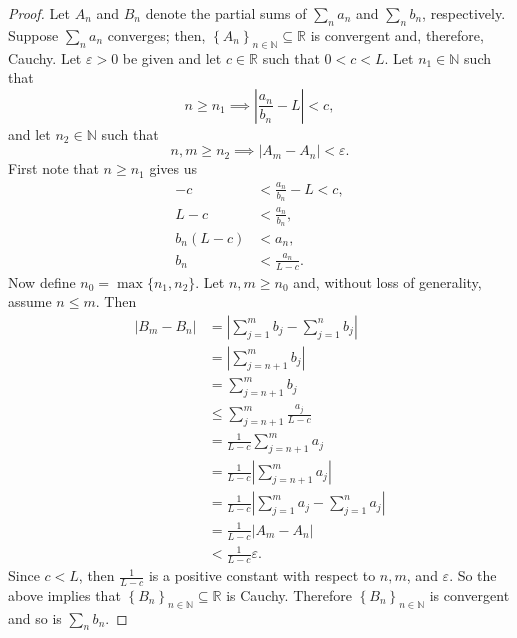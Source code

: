\documentclass[12pt]{article}
\let\eps\varepsilon %
\newcommand{\N}{\mathbb{N}} %
\newcommand{\R}{\mathbb{R}} %
\newcommand{\<}{\left\langle} %
\renewcommand{\>}{\right\rangle} %
\newcommand{\seq}[2][n]{\left\{#2\right\}_{#1\in\N}} %
\begin{document}
\begin{proof}
    Let $A_n$ and $B_n$ denote the partial sums of $\sum_n a_n$ and $\sum_n b_n$, respectively. Suppose $\sum_n a_n$ converges; then, $\seq{A_n}\subseteq\R$ is convergent and, therefore, Cauchy. Let $\eps>0$ be given and let $c\in\R$ such that $0<c<L$. Let $n_1\in\N$ such that
    \[n\geq n_1 \implies \left|\frac{a_n}{b_n} - L\right| < c,\]
    and let $n_2\in\N$ such that
    \[n,m\geq n_2 \implies |A_m - A_n| < \eps.\]
    First note that $n\geq n_1$ gives us
    \begin{align*}
        -c &< \frac{a_n}{b_n} - L < c, \\[1em]
        L - c &< \frac{a_n}{b_n}, \\[1em]
        b_n(L-c) &< a_n, \\[1em]
        b_n &< \frac{a_n}{L-c}.
    \end{align*}
    Now define $n_0=\max\{n_1,n_2\}$. Let $n,m\geq n_0$ and, without loss of generality, assume $n\leq m$. Then
    \allowdisplaybreaks
    \begin{align*}
        |B_m - B_n|
            &= \left|\sum_{j=1}^m b_j - \sum_{j=1}^n b_j\right| \\
            &= \left|\sum_{j=n+1}^m b_j\right| \\
            &= \sum_{j=n+1}^m b_j \\
            &\leq \sum_{j=n+1}^m \frac{a_j}{L-c} \\
            &= \frac1{L-c} \sum_{j=n+1}^m a_j \\
            &= \frac1{L-c} \left|\sum_{j=n+1}^m a_j\right| \\
            &= \frac1{L-c}\left|\sum_{j=1}^m a_j - \sum_{j=1}^n a_j\right| \\
            &= \frac1{L-c}|A_m - A_n| \\
            &< \frac1{L-c}\eps.
    \end{align*}
    Since $c<L$, then $\frac1{L-c}$ is a positive constant with respect to $n,m$, and $\eps$. So the above implies that $\seq{B_n}\subseteq\R$ is Cauchy. Therefore $\seq{B_n}$ is convergent and so is $\sum_n b_n$.
    

\end{proof}
\end{document}
